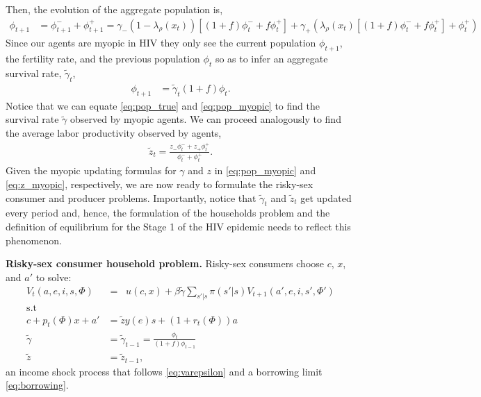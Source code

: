 Then, the evolution of the aggregate population is,
\begin{align}
    \phi_{t+1} &  = \phi^{-}_{t+1} + \phi^{+}_{t+1}  = \gamma_- (1-\lambda_\rho(x_t)) [(1 + f) \phi^-_t +  f \phi^+_t]  + \gamma_+ \left( \lambda_\rho(x_t) [(1 + f) \phi^-_t +  f \phi^+_t] + \phi^+_t \right) \label{eq:pop_true}
\end{align}
Since our agents are myopic in HIV they only see the current population $\phi_{t+1}$, the fertility rate, and the previous population $\phi_t$ so as to infer an aggregate survival rate, $\widetilde{\gamma}_t$,
\begin{align}
    \phi_{t+1} & = \widetilde{\gamma}_t (1+f) \phi_t.  \label{eq:pop_myopic}
\end{align}
Notice that we can equate \eqref{eq:pop_true} and \eqref{eq:pop_myopic} to find the survival rate $\widetilde{\gamma}$ observed by myopic agents. We can proceed analogously to find the average labor productivity observed by agents,
\begin{align}
    \widetilde{z}_t = \frac{z_-\phi^-_t + z_+\phi^+_t}{\phi^-_t + \phi^+_t}. \label{eq:z_myopic}
\end{align}
Given the myopic updating formulas for $\gamma$ and $z$ in \eqref{eq:pop_myopic} and \eqref{eq:z_myopic}, respectively, we are now ready to formulate the risky-sex consumer and producer problems. Importantly, notice that $\widetilde{\gamma}_t$ and $\widetilde{z}_t$ get updated every period and, hence, the formulation of the households problem and the definition of equilibrium for the Stage 1 of the HIV epidemic needs to reflect this phenomenon.


\noindent \textbf{Risky-sex consumer household problem.} Risky-sex consumers choose $c$, $x$, and $a'$ to solve:
\begin{align}
V_t(a,e,i,s,\Phi) &= \mathop{\max_{c\geq 0,x \geq 0,a' \geq 0}}  u(c,x) + \beta \widetilde{\gamma} \sum_{s'|s}\pi(s'|s)V_{t+1}(a',e,i,s',\Phi') \label{eq:DPi_1}\\
\mbox{s.t}\nonumber\\
c+ p_t(\Phi)x +a'&= \widetilde{z} y(e)s + (1+r_t(\Phi))a \label{eq:BCi_1}\\
\widetilde{\gamma} & = \widetilde{\gamma}_{t-1} = \frac{\phi_{t}}{(1+f) \phi_{t-1}}  \label{eq:gamma_tilde} \\
\widetilde{z} & = \widetilde{z}_{t-1},  \label{eq:z_tilde}  
\end{align}
an income shock process that follows \eqref{eq:varepsilon} and a borrowing limit \eqref{eq:borrowing}.

